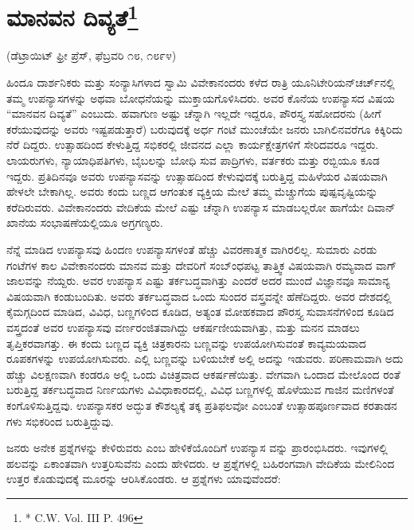 \delimiter


\section{ಮಾನವನ ದಿವ್ಯತೆ\protect\footnote{* C.W. Vol. III P. 496}}

\begin{center}
(ಡೆಟ್ರಾಯಿಟ್​ ಫ್ರೀ ಪ್ರೆಸ್​, ಫೆಬ್ರವರಿ ೧೮, ೧೮೯೪)
\end{center}

ಹಿಂದೂ ದಾರ್ಶನಿಕರು ಮತ್ತು ಸಂನ್ಯಾಸಿಗಳಾದ ಸ್ವಾಮಿ ವಿವೇಕಾನಂದರು ಕಳೆದ ರಾತ್ರಿ ಯೂನಿಟೇರಿಯನ್​ ಚರ್ಚ್​ನಲ್ಲಿ ತಮ್ಮ ಉಪನ್ಯಾಸಗಳನ್ನು ಅಥವಾ ಬೋಧನೆಯನ್ನು ಮುಕ್ತಾಯಗೊಳಿಸಿದರು. ಅವರ ಕೊನೆಯ ಉಪನ್ಯಾಸದ ವಿಷಯ “ಮಾನವನ ದಿವ್ಯತೆ” ಎಂಬುದು. ಹವಾಗುಣ ಅಷ್ಟು ಚೆನ್ನಾಗಿ ಇಲ್ಲದೇ ಇದ್ದರೂ, ಪೌರಸ್ತ್ಯ ಸಹೋದರನು (ಹೀಗೆ ಕರೆಯುವುದನ್ನು ಅವರು ಇಷ್ಟಪಡುತ್ತಾರೆ) ಬರುವುದಕ್ಕೆ ಅರ್ಧ ಗಂಟೆ ಮುಂಚೆಯೇ ಜನರು ಬಾಗಿಲಿನವರೆಗೂ ಕಿಕ್ಕಿರಿದು ನೆರೆ ದಿದ್ದರು. ಉತ್ಸಾಹದಿಂದ ಕೇಳುತ್ತಿದ್ದ ಸಭಿಕರಲ್ಲಿ ಜೀವನದ ಎಲ್ಲಾ ಕಾರ್ಯಕ್ಷೇತ್ರಗಳಿಗೆ ಸೇರಿದವರೂ ಇದ್ದರು. ಲಾಯರುಗಳು, ನ್ಯಾಯಾಧಿಪತಿಗಳು, ಬೈಬಲನ್ನು ಬೋಧಿ ಸುವ ಪಾದ್ರಿಗಳು, ವರ್ತಕರು ಮತ್ತು ರಬ್ಬಿಯೂ ಕೂಡ ಇದ್ದರು. ಪ್ರತಿದಿನವೂ ಅವರು ಉಪನ್ಯಾಸವನ್ನು ಉತ್ಸಾಹದಿಂದ ಕೇಳುವುದಕ್ಕೆ ಬರುತ್ತಿದ್ದ ಮಹಿಳೆಯರ ವಿಷಯವಾಗಿ ಹೇಳಲೇ ಬೇಕಾಗಿಲ್ಲ. ಅವರು ಕಂದು ಬಣ್ಣದ ಆಗಂತುಕ ವ್ಯಕ್ತಿಯ ಮೇಲೆ ತಮ್ಮ ಮೆಚ್ಚುಗೆಯ ಪುಷ್ಪವೃಷ್ಟಿಯನ್ನು ಕರೆದಿರುವರು. ವಿವೇಕಾನಂದರು ವೇದಿಕೆಯ ಮೇಲೆ ಎಷ್ಟು ಚೆನ್ನಾಗಿ ಉಪನ್ಯಾಸ ಮಾಡಬಲ್ಲರೋ ಹಾಗೆಯೇ ದಿವಾನ್​ ಖಾನೆಯ ಸಂಭಾಷಣೆಯಲ್ಲಿಯೂ ಅಗ್ರಗಣ್ಯರು.

ನೆನ್ನೆ ಮಾಡಿದ ಉಪನ್ಯಾಸವು ಹಿಂದಣ ಉಪನ್ಯಾಸಗಳಂತೆ ಹೆಚ್ಚು ವಿವರಣಾತ್ಮಕ ವಾಗಿರಲಿಲ್ಲ. ಸುಮಾರು ಎರಡು ಗಂಟೆಗಳ ಕಾಲ ವಿವೇಕಾನಂದರು ಮಾನವ ಮತ್ತು ದೇವರಿಗೆ ಸಂಬ್ಂಧಪಟ್ಟ ತಾತ್ತ್ವಿಕ ವಿಷಯವಾಗಿ ರಮ್ಯವಾದ ವಾಗ್​ಜಾಲವನ್ನು ನೆಯ್ದರು. ಅವರ ಉಪನ್ಯಾಸ ಎಷ್ಟು ತರ್ಕಬದ್ಧವಾಗಿತ್ತು ಎಂದರೆ ಅದರ ಮುಂದೆ ವಿಜ್ಞಾನವೂ ಸಾಮಾನ್ಯ ವಿಷಯವಾಗಿ ಕಂಡುಬಂದಿತು. ಅವರು ತರ್ಕಬದ್ಧವಾದ ಒಂದು ಸುಂದರ ವಸ್ತ್ರವನ್ನೇ ಹೆಣೆದಿದ್ದರು. ಅವರ ದೇಶದಲ್ಲಿ ಕೈಮಗ್ಗದಿಂದ ಮಾಡಿದ, ವಿವಿಧ, ಬಣ್ಣಗಳಿಂದ ಕೂಡಿದ, ಅತ್ಯಂತ ಮೋಹಕವಾದ ಪೌರಸ್ತ್ಯ ಸುವಾಸನೆಗಳಿಂದ ಕೂಡಿದ ವಸ್ತ್ರದಂತೆ ಅವರ ಉಪನ್ಯಾಸವು ವರ್ಣರಂಜಿತವಾಗಿದ್ದು ಆಕರ್ಷಣೀಯವಾಗಿತ್ತು, ಮತ್ತು ಮನನ ಮಾಡಲು ತೃಪ್ತಿಕರವಾಗತ್ತು. ಈ ಕಂದು ಬಣ್ಣದ ವ್ಯಕ್ತಿ ಚಿತ್ರಕಾರನು ಬಣ್ಣವನ್ನು ಉಪಯೋಗಿಸುವಂತೆ ಕಾವ್ಯಮಯವಾದ ರೂಪಕಗಳನ್ನು ಉಪಯೋಗಿಸುವರು. ಎಲ್ಲಿ ಬಣ್ಣವನ್ನು ಬಳಿಯಬೇಕೆ ಅಲ್ಲಿ ಅದನ್ನು ಇಡುವರು. ಪರಿಣಾಮವಾಗಿ ಅದು ಹೆಚ್ಚು ವಿಲಕ್ಷಣವಾಗಿ ಕಂಡರೂ ಅಲ್ಲಿ ಒಂದು ವಿಚಿತ್ರವಾದ ಆಕರ್ಷಣೆಯಿತ್ತು. ವೇಗವಾಗಿ ಒಂದಾದ ಮೇಲೊಂದ ರಂತೆ ಬರುತ್ತಿದ್ದ ತರ್ಕಬದ್ಧವಾದ ನಿರ್ಣಯಗಳು ವಿವಿಧಾಕಾರದಲ್ಲಿ, ವಿವಿಧ ಬಣ್ಣಗಳಲ್ಲಿ ಹೊಳೆಯುವ ಗಾಜಿನ ಮಣಿಗಳಂತೆ ಕಂಗೊಳಿಸುತ್ತಿದ್ದವು. ಉಪನ್ಯಾಸಕರ ಅದ್ಭುತ ಕೌಶಲ್ಯಕ್ಕೆ ತಕ್ಕ ಪ್ರತಿಫಲವೋ ಎಂಬಂತೆ ಉತ್ಸಾಹಪೂರ್ಣವಾದ ಕರತಾಡನ ಗಳು ಸಭಿಕರಿಂದ ಬರುತ್ತಿದ್ದುವು.

ಜನರು ಅನೇಕ ಪ್ರಶ್ನೆಗಳನ್ನು ಕೇಳಿರುವರು ಎಂಬ ಹೇಳಿಕೆಯೊಂದಿಗೆ ಉಪನ್ಯಾಸ ವನ್ನು ಪ್ರಾರಂಭಿಸಿದರು. ಇವುಗಳಲ್ಲಿ ಹಲವನ್ನು ಏಕಾಂತವಾಗಿ ಉತ್ತರಿಸುವೆನು ಎಂದು ಹೇಳಿದರು. ಆ ಪ್ರಶ್ನೆಗಳಲ್ಲಿ ಬಹಿರಂಗವಾಗಿ ವೇದಿಕೆಯ ಮೇಲಿನಿಂದ ಉತ್ತರ ಕೊಡುವುದಕ್ಕೆ ಮೂರನ್ನು ಆರಿಸಿಕೊಂಡರು. ಆ ಪ್ರಶ್ನೆಗಳು ಯಾವುವೆಂದರೆ:

